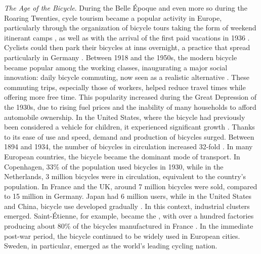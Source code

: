 \begin{refsegment}
\textsl{The Age of the Bicycle}. During the Belle Époque and even more so during the Roaring Twenties, cycle tourism became a popular activity in Europe, particularly through the organization of bicycle tours taking the form of weekend itinerant camps \textcolor{blue}{\autocite[26]{eskenazi_voir_2022}}, as well as with the arrival of the first paid vacations in 1936 \textcolor{blue}{\autocite[108]{dauncey_french_2012}}. Cyclists could then park their bicycles at inns overnight, a practice that spread particularly in Germany \textcolor{blue}{\autocite[327]{herlihy_bicycle_2004}}. Between 1918 and the 1950s, the modern bicycle became popular among the working classes, inaugurating a major social innovation: daily bicycle commuting, now seen as a realistic alternative \textcolor{blue}{\autocite[31]{jouenne_quest-ce_2022}}. These commuting trips, especially those of workers, helped reduce travel times while offering more free time. This popularity increased during the Great Depression of the 1930s, due to rising fuel prices and the inability of many households to afford automobile ownership. In the United States, where the bicycle had previously been considered a vehicle for children, it experienced significant growth \textcolor{blue}{\autocite[327]{herlihy_bicycle_2004}}. Thanks to its ease of use and speed, demand and production of bicycles surged. Between 1894 and 1934, the number of bicycles in circulation increased 32-fold \textcolor{blue}{\autocite[32]{papon_retour_2012}}. In many European countries, the bicycle became the dominant mode of transport. In Copenhagen, 33\% of the population used bicycles in 1930, while in the Netherlands, 3 million bicycles were in circulation, equivalent to the country's population. In France and the UK, around 7 million bicycles were sold, compared to 15 million in Germany. Japan had 6 million users, while in the United States and China, bicycle use developed gradually \textcolor{blue}{\autocite[329]{herlihy_bicycle_2004}}. In this context, industrial clusters emerged. Saint-Étienne, for example, became the , with over a hundred factories producing about 80\% of the bicycles manufactured in France \textcolor{blue}{\autocite[328]{herlihy_bicycle_2004}}. In the immediate post-war period, the bicycle continued to be widely used in European cities. Sweden, in particular, emerged as the world’s leading cycling nation.%


\end{refsegment}
